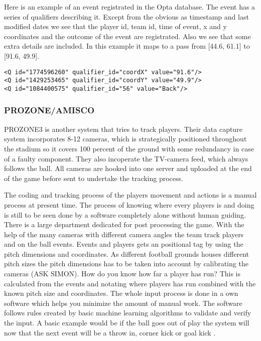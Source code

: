 Here is an example of an event registrated in the Opta database. The event has a series of qualifiers describing it. Except from the obvious as timestamp and last modified dates we see that the player id, team id, time of event, x and y coordinates and the outcome of the event are registrated. Also we see that some extra details are included. In this example it maps to a pass from [44.6, 61.1] to [91.6, 49.9].

\begin{lstlisting}
<Q id="1774596260" qualifier_id="coordX" value="91.6"/>
<Q id="1429253465" qualifier_id="coordY" value="49.9"/>
<Q id="1084400575" qualifier_id="56" value="Back"/>
\end{lstlisting}


\subsubsection{PROZONE/AMISCO}
PROZONE3  is another system that tries to track players. Their data capture system incorporates 8-12 cameras, which is strategically positioned throughout the stadium so it covers 100 percent of the ground with some redundancy in case of a faulty component. They also incoperate the TV-camera feed, which  always follows the ball. All cameras are hooked into one server and uploaded at the end of the game before sent to undertake the tracking process. 

The coding and tracking process of the players movement and actions is a manual process at present time. The process of knowing where every players is and doing is still to be seen done by a software completely alone without human guiding. There is a large department dedicated for post processing the game. With the help of the many cameras with different camera angles the team track players and on the ball events. Events and players gets an positional tag by using the pitch dimensions and coordinates. As different football grounds houses different pitch sizes the pitch dimensions has to be taken into account by calibrating the cameras (ASK SIMON). How do you know how far a player has run? This is calculated from the events and notating where players has run combined with the known pitch size and coordinates. The whole input process is done in a own software which helps you minimize the amount of manual work. The software follows rules created by basic machine learning algorithms to validate and verify the input. A basic example would be if the ball goes out of play the system will now that the next event will be a throw in, corner kick or goal kick \cite{Prozone:indepth}.

